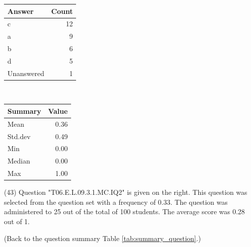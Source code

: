 \documentclass[12pt,nohyper]{tufte-handout}\usepackage[]{graphicx}\usepackage[]{color}
\begin{document}
\begin{center}%
\begin{tabular}{lr}
  \hline
Answer & Count \\ 
  \hline
c &  12 \\ 
  a &   9 \\ 
  b &   6 \\ 
  d &   5 \\ 
  Unanswered &   1 \\ 
   \hline
\end{tabular}
~~~~~~~~%
\begin{tabular}{lr}
  \hline
Summary & Value \\ 
  \hline
Mean & 0.36 \\ 
  Std.dev & 0.49 \\ 
  Min & 0.00 \\ 
  Median & 0.00 \\ 
  Max & 1.00 \\ 
   \hline
\end{tabular}
\end{center}\newpage{} (43) Question "T06.E.L.09.3.1.MC.IQ2" is given on the right. This question was selected from the question set with a frequency of 0.33. The question was administered to 25 out of the total of 100 students. The average score was 0.28 out of 1.

 (Back to the question summary Table \ref{tab:summary_question}.)
\end{document}
